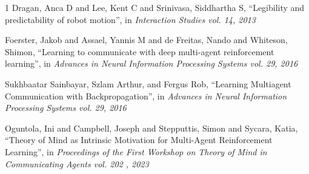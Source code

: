 \documentclass{article}
\begin{document}
\begin{thebibliography}{1}
Dragan, Anca D and Lee, Kent C and Srinivasa, Siddhartha S,
\newblock ``Legibility and predictability of robot motion'',
\newblock in {\em Interaction Studies vol. 14, 2013}

Foerster, Jakob and Assael, Yannis M and de Freitas, Nando and Whiteson, Shimon,
\newblock ``Learning to communicate with deep multi-agent reinforcement learning'',
\newblock in {\em Advances in Neural Information Processing Systems vol. 29, 2016}

Sukhbaatar Sainbayar, Szlam Arthur, and Fergus Rob,
\newblock ``Learning Multiagent Communication with Backpropagation'',
\newblock in {\em Advances in Neural Information Processing Systems vol. 29, 2016}

Oguntola, Ini and Campbell, Joseph and Stepputtis, Simon and Sycara, Katia,
\newblock ``Theory of Mind as Intrinsic Motivation for Multi-Agent Reinforcement Learning'',
\newblock in {\em Proceedings of the First Workshop on Theory of Mind in Communicating Agents vol. 202 , 2023}


\end{thebibliography}
\end{document}
